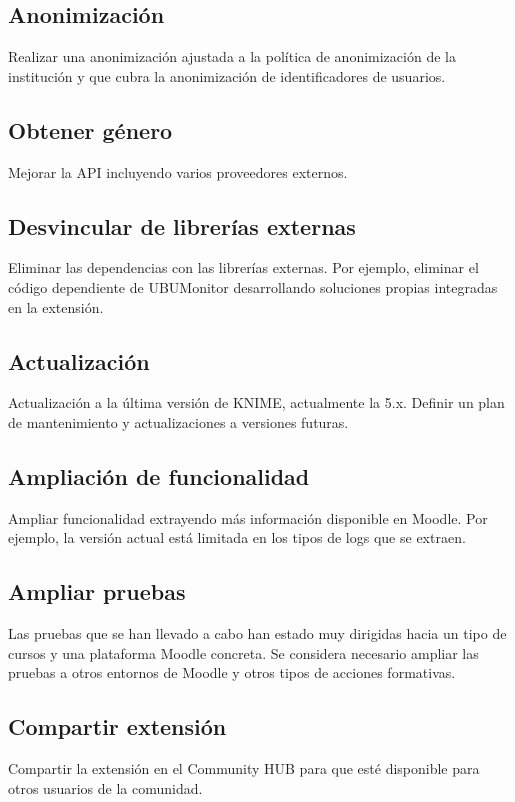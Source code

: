\subsection{Anonimización}

Realizar una anonimización ajustada a la política de anonimización de la institución y que cubra la anonimización de identificadores de usuarios. 


\subsection{Obtener género}

Mejorar la API incluyendo varios proveedores externos. 


\subsection{Desvincular de librerías externas}

Eliminar las dependencias con las librerías externas. Por ejemplo, eliminar el código dependiente de UBUMonitor desarrollando soluciones propias integradas en la extensión. 

\subsection{Actualización}

Actualización a la última versión de KNIME, actualmente la 5.x. Definir un plan de mantenimiento y actualizaciones a versiones futuras. 


\subsection{Ampliación de funcionalidad}

Ampliar funcionalidad extrayendo más información disponible en Moodle. Por ejemplo, la versión actual está limitada en los tipos de logs que se extraen. 


\subsection{Ampliar pruebas}

Las pruebas que se han llevado a cabo han estado muy dirigidas hacia un tipo de cursos y una plataforma Moodle concreta. Se considera necesario 
ampliar las pruebas a otros entornos de Moodle y otros tipos de acciones formativas. 


\subsection{Compartir extensión}

Compartir la extensión en el Community HUB para que esté disponible para otros usuarios de la comunidad. 


